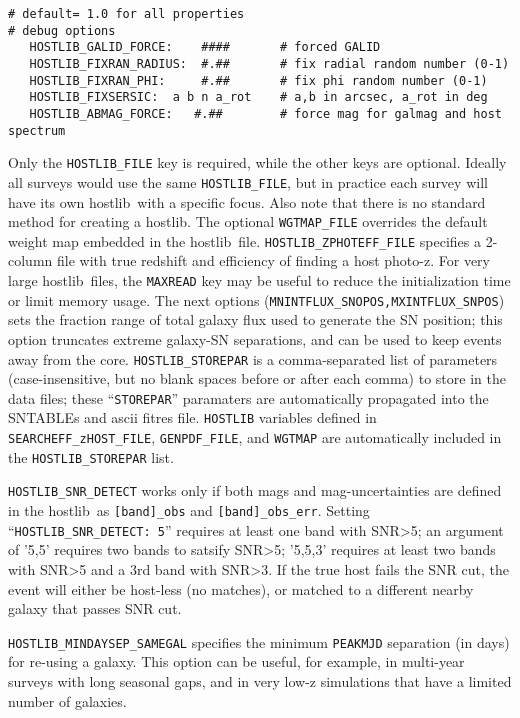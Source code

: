 \documentclass[12pt]{article}
\newcommand{\hostlib}{{\sc hostlib}}
\begin{document}
{\begin{Verbatim}[frame=single]
                                      # default= 1.0 for all properties
# debug options
   HOSTLIB_GALID_FORCE:    ####       # forced GALID 
   HOSTLIB_FIXRAN_RADIUS:  #.##       # fix radial random number (0-1)
   HOSTLIB_FIXRAN_PHI:     #.##       # fix phi random number (0-1)
   HOSTLIB_FIXSERSIC:  a b n a_rot    # a,b in arcsec, a_rot in deg
   HOSTLIB_ABMAG_FORCE:   #.##        # force mag for galmag and host spectrum
\end{Verbatim}
Only the {\tt HOSTLIB\_FILE} key is required, while the
other keys are optional. Ideally all surveys would use
the same {\tt HOSTLIB\_FILE}, but in practice each survey
will have its own \hostlib\ with a specific focus.
Also note that there is no standard method for creating 
a \hostlib. The optional {\tt WGTMAP\_FILE} overrides the 
default weight map embedded in the
\hostlib\ file. 
{\tt HOSTLIB\_ZPHOTEFF\_FILE} specifies a 2-column file with
true redshift and efficiency of finding a host photo-z.
For very large \hostlib\ files,
the {\tt MAXREAD} key may be useful to reduce the 
initialization time or limit memory usage.
The next options ({\tt MNINTFLUX\_SNOPOS,MXINTFLUX\_SNPOS}) sets the
fraction range of total galaxy flux used to generate the
SN position; this option truncates extreme galaxy-SN
separations, and can be used to keep events away from the core.
{\tt HOSTLIB\_STOREPAR} is a comma-separated
list of parameters (case-insensitive, but no blank spaces
before or after each comma) to store in the data files;
these ``{\tt STOREPAR}'' paramaters are automatically propagated 
into the SNTABLEs  and ascii fitres file.
{\tt HOSTLIB} variables defined in 
{\tt SEARCHEFF\_zHOST\_FILE},
{\tt GENPDF\_FILE}, and
{\tt WGTMAP}
are automatically included in the {\tt HOSTLIB\_STOREPAR} list.


{\tt HOSTLIB\_SNR\_DETECT} works only if both mags and mag-uncertainties
are defined in the \hostlib\ as {\tt [band]\_obs} and {\tt [band]\_obs\_err}.
Setting ``{\tt HOSTLIB\_SNR\_DETECT: 5}'' requires at least one band with
SNR>5; an argument of '5,5' requires two bands to satsify SNR>5;
'5,5,3' requires at least two bands with SNR>5 and a 3rd band with SNR>3.
If the true host fails the SNR cut, the event will either be host-less
(no matches), or matched to a different nearby galaxy that
passes SNR cut.

{\tt HOSTLIB\_MINDAYSEP\_SAMEGAL} specifies the minimum
{\tt PEAKMJD} separation (in days) for re-using a galaxy.
This option can be useful, for example, in multi-year surveys 
with long seasonal gaps, and in very low-z simulations that have 
a limited number of galaxies.


}
\end{document}
